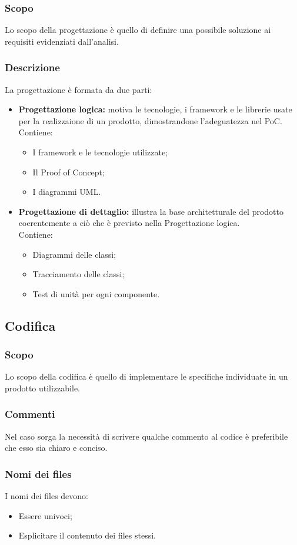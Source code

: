   \subsubsection{Scopo}
  Lo scopo della progettazione è quello di definire una possibile soluzione ai requisiti evidenziati dall'analisi.
  \subsubsection{Descrizione}
  La progettazione è formata da due parti:
  \begin{itemize}
    \item \textbf{Progettazione logica:} motiva le tecnologie, i framework e le librerie usate per la realizzaione di un prodotto, dimostrandone l'adeguatezza nel PoC.
    \\Contiene:
    \begin{itemize}
      \item I framework e le tecnologie utilizzate;
      \item Il Proof of Concept;
      \item I diagrammi UML.
    \end{itemize}
    \item \textbf{Progettazione di dettaglio:} illustra la base architetturale del prodotto coerentemente a ciò che è previsto nella Progettazione logica.
    \\Contiene:
    \begin{itemize}
      \item Diagrammi delle classi;
      \item Tracciamento delle classi;
      \item Test di unità per ogni componente.
    \end{itemize}
  \end{itemize}

  \subsection{Codifica}
  \subsubsection{Scopo}
  Lo scopo della codifica è quello di implementare le specifiche individuate in un prodotto utilizzabile.
  \subsubsection{Commenti}
  Nel caso sorga la necessità di scrivere qualche commento al codice è preferibile che esso sia chiaro e conciso.
  \subsubsection{Nomi dei files}
  I nomi dei files devono:
  \begin{itemize}
    \item Essere univoci;
    \item Esplicitare il contenuto dei files stessi.
  \end{itemize}
